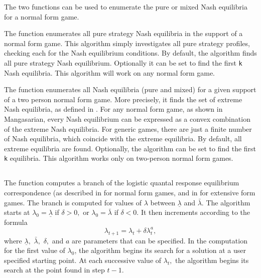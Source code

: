 The two  functions can be used to enumerate the pure or
mixed Nash equilibria for a normal form game.

The  function enumerates all pure strategy Nash
equilibria in the support of a normal form game.  This algorithm
simply investigates all pure strategy profiles, checking each for the
Nash equilibrium conditions.  By default, the algorithm finds all pure
strategy Nash equilibrium.  Optionally it can be set to find the first
\verb+k+ Nash equilibria.  This algorithm will work on any normal form
game.

The  function enumerates all Nash equilibria (pure
and mixed) for a given support of a two person normal form game.  More
precisely, it finds the set of extreme Nash equilibria, as defined in
\cite[1964]{Man:64}.  For any normal form game, as shown in
Mangasarian, every Nash equilibrium can be expressed as a convex
combination of the extreme Nash equilibria.  For generic games, there
are just a finite number of Nash equilibria, which coincide with the
extreme equilibria.  By default, all extreme equilibria are found.
Optionally, the algorithm can be set to find the first \verb+k+
equilibria.  This algorithm works only on two-person normal form
games.

\subsection{}

The  function computes a branch of the logistic
quantal response equilibrium correspondence (as described in
\cite{McKPal:95a} for normal form games, and in
\cite{McKPal:95b} for extensive form games.  The branch is
computed for values of $\lambda$ between $\underline{\lambda}$ and
$\bar{\lambda}.$ The algorithm starts at $\lambda_0 =
\underline{\lambda}$ if $\delta>0,$ or $\lambda_0 = \bar{\lambda}$ if
$\delta<0$. It then increments according to the formula
$$
\lambda_{t+1} = \lambda_t +\delta \lambda_t^a,
$$ 
where $\underline\lambda,$ $\bar\lambda,$ $\delta,$ and $a$ are
parameters that can be specified.  In the computation for the first value of
$\lambda_0$, the algorithm begins its search for a solution at a user
specified starting point.  At each
successive value of $\lambda_t,$ the algorithm begins its search at
the point found in step $t - 1.$ 

